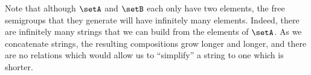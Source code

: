 Note that although $\setA$ and $\setB$ each only have two elements, the free semigroups that they generate will have infinitely many elements. Indeed, there are infinitely many strings that we can build from the elements of $\setA$. As we concatenate strings, the resulting compositions grow longer and longer, and there are no relations which would allow us to ``simplify'' a string to one which is shorter.

